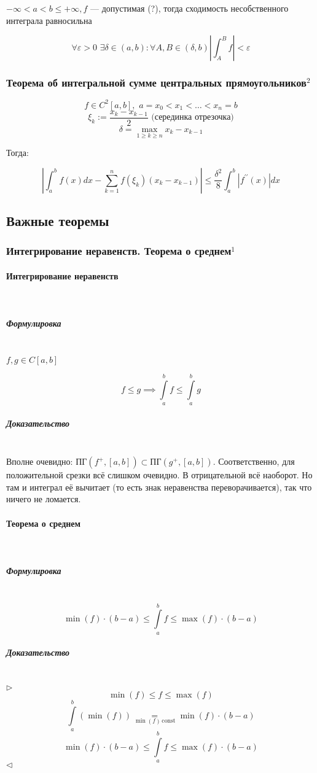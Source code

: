 \documentclass{article}
\def\dbl{\,\,}
\let\vanillaparagraph\paragraph
\let\vanillasubparagraph\subparagraph
\renewcommand{\paragraph}[1]{\vanillaparagraph{#1}\mbox{}\\}
\renewcommand{\subparagraph}[1]{\vanillasubparagraph{#1}\mbox{}\\}
\begin{document}
$-\infty < a < b \le +\infty, f$ --- допустимая (?), тогда сходимость несобственного интеграла равносильна 

\[\forall \varepsilon > 0 \dbl \exists \delta \in (a, b) : \forall A, B \in (\delta, b) \left|\int_A^B f\right| < \varepsilon \]

\subsubsection{Теорема об интегральной сумме центральных прямоугольников\texorpdfstring{$^2$}{}}

\[f \in C^2[a, b], \dbl a = x_0 < x_1 < \ldots < x_n = b\]
\[\xi_k := \frac{x_k - x_{k - 1}}{2}\text{ (серединка отрезочка)}\] 
\[\delta = \max_{1 \ge k \ge n}{x_k - x_{k - 1}}\]

Тогда:

\[\left|\int_a^b{f(x)dx} - \sum_{k = 1}^n{f(\xi_k)(x_k - x_{k - 1})}\right| \le \frac{\delta^2}{8}\int_a^b{|f^{\prime\prime}(x)|dx}\]

\newpage
\subsection{Важные теоремы}
\subsubsection{Интегрирование неравенств. Теорема о среднем\texorpdfstring{$^1$}{}}
\paragraph{Интегрирование неравенств}
\subparagraph{Формулировка}
$f, g \in C[a, b]$

$$
f \le g \implies \int\limits_a^b f \le \int\limits_a^b g
$$

\subparagraph{Доказательство}
Вполне очевидно: $\text{ПГ}(f^+, [a, b]) \subset \text{ПГ}(g^+, [a, b])$.
Соответственно, для положительной срезки всё слишком очевидно. В отрицательной всё наоборот. Но там и интеграл её вычитает (то есть знак неравенства переворачивается), так что ничего не ломается.


\paragraph{Теорема о среднем}
\subparagraph{Формулировка}
$$
\min(f) \cdot (b - a) \le \int\limits_a^b f \le \max(f) \cdot (b-a)
$$

\subparagraph{Доказательство}
$\rhd$
$$
\min(f) \le f \le \max(f)
$$
$$
\int\limits_a^b(\min(f)) \underset{\min(f) \, \text{const}}{=} \min(f) \cdot (b - a)
$$
$$
\min(f) \cdot (b - a) \le \int\limits_a^b f \le \max(f) \cdot (b-a)
$$
$\lhd$
\end{document}
